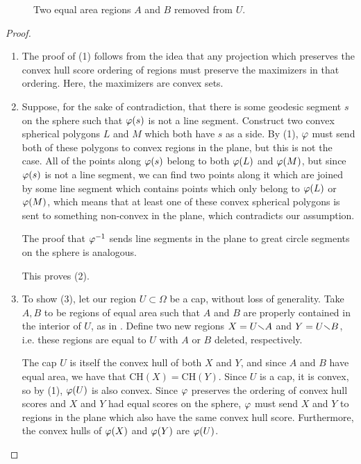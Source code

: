 \begin{figure}[h]
	\centering
	
	\caption{Two equal area regions $A$ and $B$ removed from $U$.}
	\label{fig:ch_schema}
\end{figure}



\begin{proof}
	\ \\
	
	\vspace*{-2em}
	\begin{enumerate}
		\item[] The proof of (1) follows from the idea that any projection which preserves the convex hull score ordering of regions must 
		preserve the maximizers in that ordering.   Here, the maximizers are convex sets.
		
		\item[]  Suppose, for the sake of contradiction, that there is some geodesic segment $s$ on the sphere such that $\varphi(s)$ is not a line segment. Construct two convex spherical polygons $L$ and $M$ which both have $s$ as a side.  By (1), $\varphi$ must send both of these polygons to convex regions in the plane, but this is not the case.  All of the points along $\varphi(s)$ belong to both $\varphi(L)$ and $\varphi(M)$, but since $\varphi(s)$ is not a line segment, we can find two points along it which are joined by some line segment which contains points which only belong to $\varphi(L)$ or $\varphi(M)$, which means that at least one of these convex spherical polygons is sent to something non-convex in the plane, which contradicts our assumption.		
		
		The proof that $\varphi^{-1}$ sends line segments in the plane to great circle segments on the sphere is analogous.  
		
		This proves (2).
		
		
		
\item[] To show (3), let our region $U\subset\Omega$ be a cap, without loss of generality.  Take $A,B$ to be regions of equal area such that $A$ and $B$ are properly contained in the interior of $U$, as in .  Define two new regions $X=U{\smallsetminus} A$ and $Y=U{\smallsetminus} B$, i.e. these regions are equal to $U$ with $A$ or $B$ deleted, respectively.  

The cap $U$ is itself the convex hull of both $X$ and $Y$, and since $A$ and $B$ have equal area, we have that $\mathrm{CH}(X) = \mathrm{CH}(Y)$.  Since $U$ is a cap, it is convex, so by (1), $\varphi(U)$ is also convex.  Since $\varphi$ preserves the ordering of convex hull scores and $X$ and $Y$ had equal scores on the sphere, $\varphi$ must send $X$ and $Y$ to regions in the plane which also have the same convex hull score.  Furthermore, the convex hulls of $\varphi(X)$ and $\varphi(Y)$ are $\varphi(U)$.


\end{enumerate}
\end{proof}
